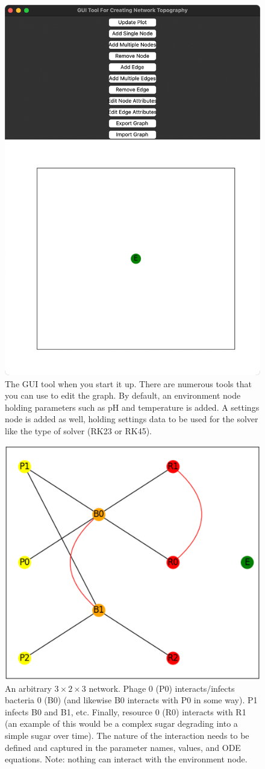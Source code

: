 \begin{figure}
    \centering
    \includegraphics[width=0.5\linewidth]{Screenshots/initial_startup_GUI_tool.png}
    \caption{The GUI tool when you start it up. There are numerous tools that you can use to edit the graph. By default, an environment node holding parameters such as pH and temperature is added. A settings node is added as well, holding settings data to be used for the solver like the type of solver (RK23 or RK45). }
    \label{fig:ss:initial_startup_GUI_tool}
\end{figure}


\begin{figure}
    \centering
    \includegraphics[width=0.5\linewidth]{Screenshots/example_network.png}
    \caption{An arbitrary $3\times2\times3$ network. Phage 0 (P0) interacts/infects bacteria 0 (B0) (and likewise B0 interacts with P0 in some way). P1 infects B0 and B1, etc. Finally, resource 0 (R0) interacts with R1 (an example of this would be a complex sugar degrading into a simple sugar over time). The nature of the interaction needs to be defined and captured in the parameter names, values, and ODE equations. Note: nothing can interact with the environment node.}
    \label{fig:ss:example_network}
\end{figure}
 

